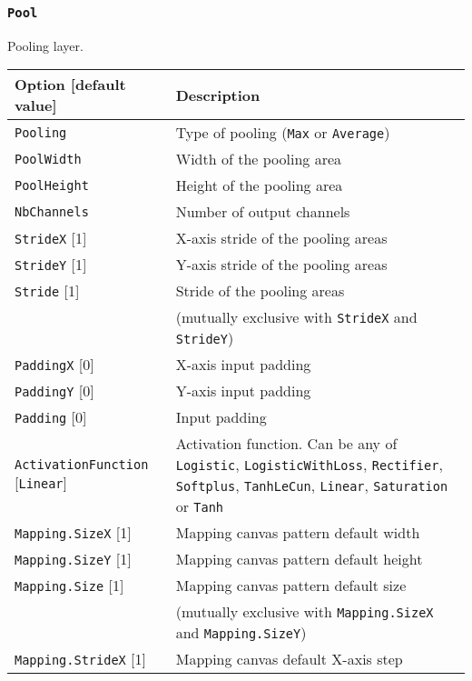 \documentclass[a4paper,11pt,oneside]{article}
\begin{document}
\subsubsection{\texorpdfstring{%
\lstinline[basicstyle=\ttfamily\bfseries]!Pool!}{Pool}}
Pooling layer.

\begin{center}
 \begin{longtable}{| p{5cm} | p{10cm} | }
 \hline
 Option [default value] & Description\\
 \hline\hline
  \cellcolor{requiredcolor}\lstinline!Pooling! & Type of pooling
  (\lstinline!Max! or \lstinline!Average!)\\
  \cellcolor{requiredcolor}\lstinline!PoolWidth! & Width of the pooling area \\
  \cellcolor{requiredcolor}\lstinline!PoolHeight! & Height of the pooling
area \\
  \cellcolor{requiredcolor}\lstinline!NbChannels! & Number of output channels \\
  \lstinline!StrideX! [1] & X-axis stride of the pooling areas \\
  \lstinline!StrideY! [1] & Y-axis stride of the pooling areas \\
  \lstinline!Stride! [1] & Stride of the pooling areas \\
   & (mutually exclusive with \lstinline!StrideX! and \lstinline!StrideY!) \\
  \lstinline!PaddingX! [0] & X-axis input padding \\
  \lstinline!PaddingY! [0] & Y-axis input padding \\
  \lstinline!Padding! [0] & Input padding \\
  \lstinline!ActivationFunction! [\lstinline!Linear!] & Activation function.
  Can be any of \lstinline!Logistic!,  \lstinline!LogisticWithLoss!,
  \lstinline!Rectifier!, \lstinline!Softplus!, \lstinline!TanhLeCun!,
  \lstinline!Linear!, \lstinline!Saturation! or \lstinline!Tanh! \\
  \lstinline!Mapping.SizeX! [1] & Mapping canvas pattern default width \\
  \lstinline!Mapping.SizeY! [1] & Mapping canvas pattern default height \\
  \lstinline!Mapping.Size! [1] & Mapping canvas pattern default size \\
   & (mutually exclusive with \lstinline!Mapping.SizeX!
   and \lstinline!Mapping.SizeY!) \\
  \lstinline!Mapping.StrideX! [1] & Mapping canvas default X-axis step \\

\end{longtable}
\end{center}
\end{document}

